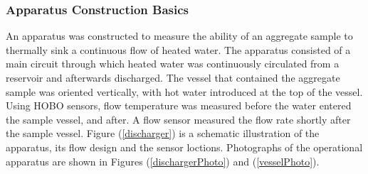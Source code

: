 \subsubsection{Apparatus Construction Basics}
An apparatus was constructed to measure the ability of an aggregate sample to thermally sink a continuous flow of heated water. The apparatus consisted of a main circuit through which heated water was continuously circulated from a reservoir and afterwards discharged. The vessel that contained the aggregate sample was oriented vertically, with hot water introduced at the top of the vessel. Using HOBO sensors, flow temperature was measured before the water entered the sample vessel, and after. A flow sensor measured the flow rate shortly after the sample vessel. Figure (\ref{discharger}) is a schematic illustration of the apparatus, its flow design and the sensor loctions. Photographs of the operational apparatus are shown in Figures (\ref{dischargerPhoto}) and (\ref{vesselPhoto}). 

